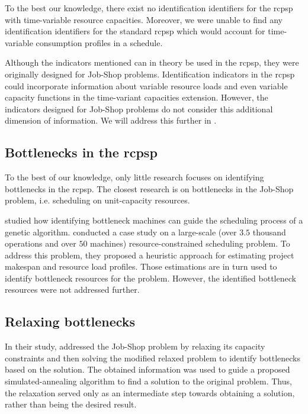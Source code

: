 To the best our knowledge, there exist no identification identifiers for the \ac{rcpsp}
with time-variable resource capacities.
Moreover, we were unable to find any identification identifiers for the standard \ac{rcpsp}
which would account for time-variable consumption profiles in a schedule.

Although the indicators mentioned can in theory be used in the \ac{rcpsp},
they were originally designed for Job-Shop problems.
Identification indicators in the \ac{rcpsp} could incorporate information about
variable resource loads and even
variable capacity functions in the time-variant capacities extension.
However, the indicators designed for Job-Shop problems do not consider
this additional dimension of information.
We will address this further in .

\subsection{Bottlenecks in the \acs{rcpsp}} \label{subsec:related-works/bottlenecks-in-scheduling/bottlenecks-in-the-rcpsp}

To the best of our knowledge, only little research focuses on identifying bottlenecks in the \ac{rcpsp}.
The closest research is on bottlenecks in the Job-Shop problem,
i.e. scheduling on unit-capacity resources.

\citet{Luo2023} studied how identifying bottleneck machines can guide the scheduling
process of a genetic algorithm.
\citet{Arkhipov2017} conducted a case study on a large-scale
(over $3.5$ thousand operations and over $50$ machines)
resource-constrained scheduling problem.
To address this problem, they proposed a heuristic approach for estimating project makespan
and resource load profiles.
Those estimations are in turn used to identify bottleneck resources for the problem.
However, the identified bottleneck resources were not addressed further.

\subsection{Relaxing bottlenecks} \label{subsec:related-works/bottlenecks-in-scheduling/relaxing-bottlenecks}

In their study, \citet{Zhang2012} addressed the Job-Shop problem by relaxing its capacity constraints
and then solving the modified relaxed problem to identify bottlenecks based on the solution.
The obtained information was used to guide a proposed simulated-annealing
algorithm to find a solution to the original problem.
Thus, the relaxation served only as an intermediate step towards obtaining a solution,
rather than being the desired result.

